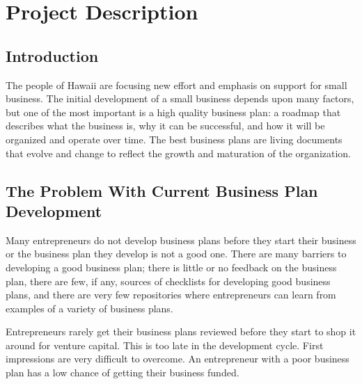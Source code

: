 
\section{Project Description}

\subsection{Introduction}

The people of Hawaii are focusing new effort and emphasis on support for
small business.  The initial development of a small business depends upon
many factors, but one of the most important is a high quality business
plan: a roadmap that describes what the business is, why it can be
successful, and how it will be organized and operate over time.  The best
business plans are living documents that evolve and change to reflect the
growth and maturation of the organization.

\subsection{The Problem With Current Business Plan Development}

Many entrepreneurs do not develop business plans before they start their
business or the business plan they develop is not a good one.  There are
many barriers to developing a good business plan; there is little or no
feedback on the business plan, there are few, if any, sources of checklists
for developing good business plans, and there are very few repositories
where entrepreneurs can learn from examples of a variety of business plans.

Entrepreneurs rarely get their business plans reviewed before they start to
shop it around for venture capital.  This is too late in the development
cycle.  First impressions are very difficult to overcome.  An entrepreneur
with a poor business plan has a low chance of getting their business
funded.

